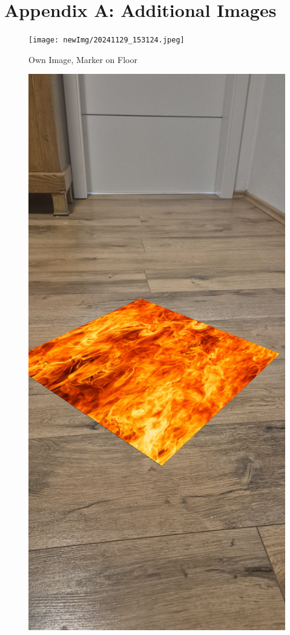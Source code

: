 \documentclass[a4paper,twocolumn]{article}
\begin{document}
\pagebreak

\appendix
\section*{Appendix A: Additional Images}

\begin{figure}[htbp]
    \centering
    \texttt{[image: newImg/20241129\_153124.jpeg]}
    \caption{Own Image, Marker on Floor \cite{tim-schweitzer}}
    \label{fig:example-appendix1}
\end{figure}

\begin{figure}[htbp]
    \centering
    \includegraphics[width=\columnwidth, keepaspectratio]{newOutput/20241129_153124.jpg}

\end{figure}
\end{document}
